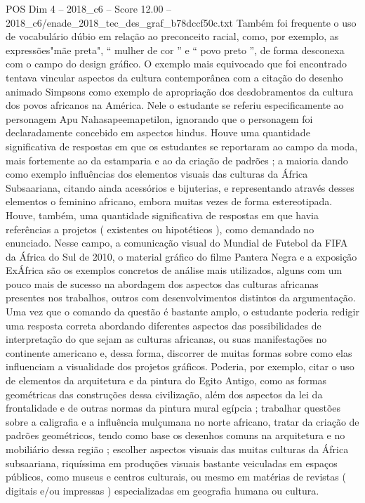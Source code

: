 \begin{textsample}{POS Dim 4 – 2018\_c6 – Score 12.00 – 2018\_c6/enade\_2018\_tec\_des\_graf\_b78dccf50c.txt}
Também foi frequente o uso de vocabulário dúbio em relação ao preconceito racial, como, por exemplo, as expressões"mãe preta", “ mulher de cor ” e “ povo preto ”, de forma desconexa com o campo do design gráfico.
O exemplo mais equivocado que foi encontrado tentava vincular aspectos da cultura contemporânea com a citação do desenho animado Simpsons como exemplo de apropriação dos desdobramentos da cultura dos povos africanos na América.
Nele o estudante se referiu especificamente ao personagem Apu Nahasapeemapetilon, ignorando que o personagem foi declaradamente concebido em aspectos hindus.
Houve uma quantidade significativa de respostas em que os estudantes se reportaram ao campo da moda, mais fortemente ao da estamparia e ao da criação de padrões ; a maioria dando como exemplo influências dos elementos visuais das culturas da África Subsaariana, citando ainda acessórios e bijuterias, e representando através desses elementos o feminino africano, embora muitas vezes de forma estereotipada.
Houve, também, uma quantidade significativa de respostas em que havia referências a projetos ( existentes ou hipotéticos ), como demandado no enunciado.
Nesse campo, a comunicação visual do Mundial de Futebol da FIFA da África do Sul de 2010, o material gráfico do filme Pantera Negra e a exposição ExÁfrica são os exemplos concretos de análise mais utilizados, alguns com um pouco mais de sucesso na abordagem dos aspectos das culturas africanas presentes nos trabalhos, outros com desenvolvimentos distintos da argumentação.
Uma vez que o comando da questão é bastante amplo, o estudante poderia redigir uma resposta correta abordando diferentes aspectos das possibilidades de interpretação do que sejam as culturas africanas, ou suas manifestações no continente americano e, dessa forma, discorrer de muitas formas sobre como elas influenciam a visualidade dos projetos gráficos.
Poderia, por exemplo, citar o uso de elementos da arquitetura e da pintura do Egito Antigo, como as formas geométricas das construções dessa civilização, além dos aspectos da lei da frontalidade e de outras normas da pintura mural egípcia ; trabalhar questões sobre a caligrafia e a influência mulçumana no norte africano, tratar da criação de padrões geométricos, tendo como base os desenhos comuns na arquitetura e no mobiliário dessa região ; escolher aspectos visuais das muitas culturas da África subsaariana, riquíssima em produções visuais bastante veiculadas em espaços públicos, como museus e centros culturais, ou mesmo em matérias de revistas ( digitais e/ou impressas ) especializadas em geografia humana ou cultura.

\end{textsample}
